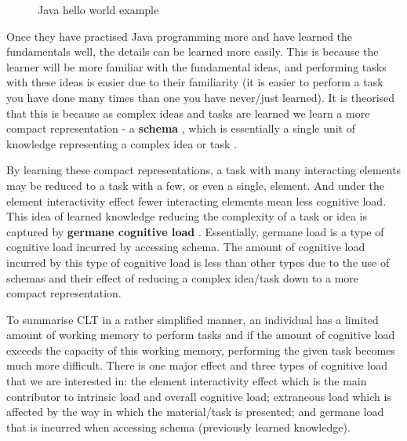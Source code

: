\documentclass[12pt]{article}
\newcommand{\keyword}[1]{%
    \textbf{#1}%
}
\begin{document}
\begin{figure}
    \centering
     \lstset{xleftmargin=20pt}
    
    \caption{Java hello world example}
    \label{fig:java_hello_world}
\end{figure}

Once they have practised Java programming more and have learned the fundamentals well, the details can be learned more easily. This is because the learner will be more familiar with the fundamental ideas, and performing tasks with these ideas is easier due to their familiarity (it is easier to perform a task you have done many times than one you have never/just learned). It is theorised that this is because as complex ideas and tasks are learned we learn a more compact representation - a \keyword{schema}, which is essentially a single unit of knowledge representing a complex idea or task \citep{axelrod1973schema, abelson1981psychological, bartlett1995remembering}. 

By learning these compact representations, a task with many interacting elements may be reduced to a task with a few, or even a single, element. And under the element interactivity effect fewer interacting elements mean less cognitive load. This idea of learned knowledge reducing the complexity of a task or idea is captured by \keyword{germane cognitive load}. Essentially, germane load is a type of cognitive load incurred by accessing schema. The amount of cognitive load incurred by this type of cognitive load is less than other types due to the use of schemas and their effect of reducing a complex idea/task down to a more compact representation.

To summarise CLT in a rather simplified manner, an individual has a limited amount of working memory to perform tasks and if the amount of cognitive load exceeds the capacity of this working memory, performing the given task becomes much more difficult. There is one major effect and three types of cognitive load that we are interested in: the element interactivity effect which is the main contributor to intrinsic load and overall cognitive load; extraneous load which is affected by the way in which the material/task is presented; and germane load that is incurred when accessing schema (previously learned knowledge).
\end{document}
